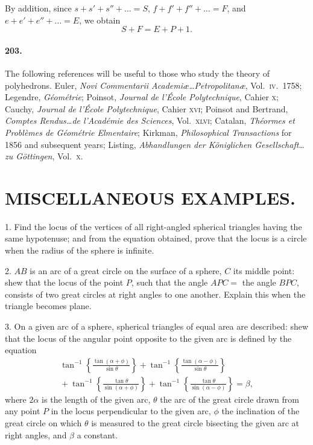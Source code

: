 \documentclass{book}[2004/02/16]
\begin{document}
\begin{mainmatter}
\begin{spacing}{1.3}
By addition, since
$s + s' + s'' + \ldots = S$,
$f + f' + f'' + \ldots = F$, and
$e + e' + e'' + \ldots = E$, we obtain
\[
  S + F = E + P + 1.
\]

\paragraph{203.} The following references will be useful to those who
study the theory of polyhedrons. Euler, \textit{Novi Commentarii
Acad\-emi{\ae}\ldots Pe\-tro\-pol\-i\-tan{\ae}}, Vol.~\textsc{iv.}\ 1758; Legendre, \textit{G{\'e}om{\'e}trie};
Poinsot, \textit{Journal de l'\'Ecole Polytechnique}, Cahier \textsc{x}; Cauchy,
\textit{Journal de l'\'Ecole Polytechnique}, Cahier \textsc{xvi}; Poinsot and Bertrand,
\textit{Comptes Rendus\ldots de l'Acad\-\'emie des Sciences}, Vol.~\textsc{xlvi}; Catalan,
\textit{Th{\'e}\-ormes et Prob\-l{\`e}mes de G{\'e}o\-m{\'e}\-trie El\-men\-taire}; Kirkman, \textit{Philosophical
Transactions} for 1856 and subsequent years; Listing,
\textit{Abhandlungen der K{\"o}nig\-lichen Ge\-sell\-schaft\ldots zu G{\"o}tt\-ingen}, Vol.~\textsc{x}.

\section*{\centering\normalsize MISCELLANEOUS EXAMPLES.}

1. Find the locus of the vertices of all right-angled spherical
triangles having the same hypotenuse; and from the equation
obtained, prove that the locus is a circle when the radius of the
sphere is infinite.
\medskip

2. $AB$ is an arc of a great circle on the surface of a sphere, $C$
its middle point: shew that the locus of the point $P$, such that
the angle $APC =$ the angle $BPC$, consists of two great circles at
right angles to one another. Explain this when the triangle
becomes plane.
\medskip

3. On a given arc of a sphere, spherical triangles of equal
area are described: shew that the locus of the angular point
opposite to the given arc is defined by the equation
\begin{multline*}
  \tan^{-1} \left\{\frac{\tan (\alpha + \phi)}{\sin \theta}\right\}
+ \tan^{-1} \left\{\frac{\tan (\alpha - \phi)}{\sin \theta}\right\} \\
{}
+ \tan^{-1} \left\{\frac{\tan \theta}{\sin (\alpha + \phi)}\right\}
+ \tan^{-1} \left\{\frac{\tan \theta}{\sin (\alpha - \phi)}\right\}
= \beta,
\end{multline*}
where $2\alpha$ is the length of the given arc, $\theta$ the arc of the great
circle drawn from any point $P$ in the locus perpendicular to the
given arc, $\phi$ the inclination of the great circle on which $\theta$ is
measured to the great circle bisecting the given arc at right
angles, and $\beta$ a constant.
\medskip


\end{spacing}
\end{mainmatter}
\end{document}
